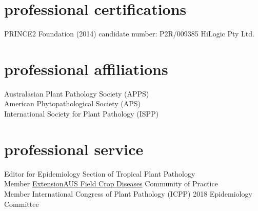 \section*{professional certifications}
        PRINCE2 Foundation (2014) candidate number: P2R/009385  HiLogic Pty Ltd.

\section*{professional affiliations}
  Australasian Plant Pathology Society (APPS)\\[3 mm]
  American Phytopathological Society (APS)\\[3 mm]
  International Society for Plant Pathology (ISPP)\\

\section*{professional service}
  Editor for Epidemiology Section of Tropical Plant Pathology\\[3 mm]
  Member \href{http://extensionaus.com.au/field-crop-diseases/}{ExtensionAUS Field Crop Diseases} Community of Practice\\[3 mm]
  Member International Congress of Plant Pathology (ICPP) 2018 Epidemiology Committee\\
